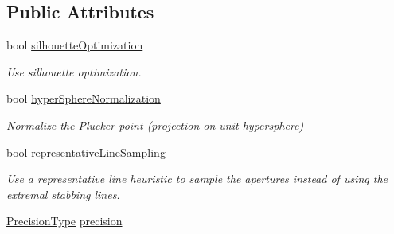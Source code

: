 \subsection*{Public Attributes}
\begin{DoxyCompactItemize}
\item 
\mbox{\label{structvisilib_1_1_visibility_exact_query_configuration_a9c7e192417bf965199370bc13fe4d572}} 
bool \mbox{\hyperlink{structvisilib_1_1_visibility_exact_query_configuration_a9c7e192417bf965199370bc13fe4d572}{silhouette\+Optimization}}
\begin{DoxyCompactList}\small\item\em Use silhouette optimization. \end{DoxyCompactList}\item 
\mbox{\label{structvisilib_1_1_visibility_exact_query_configuration_ae3f308c718e6e7051c9d8a1d08065def}} 
bool \mbox{\hyperlink{structvisilib_1_1_visibility_exact_query_configuration_ae3f308c718e6e7051c9d8a1d08065def}{hyper\+Sphere\+Normalization}}
\begin{DoxyCompactList}\small\item\em Normalize the Plucker point (projection on unit hypersphere) \end{DoxyCompactList}\item 
\mbox{\label{structvisilib_1_1_visibility_exact_query_configuration_adadc6d7391bfcfdd0b8f20efe79c81cf}} 
bool \mbox{\hyperlink{structvisilib_1_1_visibility_exact_query_configuration_adadc6d7391bfcfdd0b8f20efe79c81cf}{representative\+Line\+Sampling}}
\begin{DoxyCompactList}\small\item\em Use a representative line heuristic to sample the apertures instead of using the extremal stabbing lines. \end{DoxyCompactList}\item 
\mbox{\label{structvisilib_1_1_visibility_exact_query_configuration_a85a72847cd60b3d5d41d0a893e439a71}} 
\mbox{\hyperlink{structvisilib_1_1_visibility_exact_query_configuration_a1cd44b0dffc3d51eb0bd5af35eeb9a8b}{Precision\+Type}} \mbox{\hyperlink{structvisilib_1_1_visibility_exact_query_configuration_a85a72847cd60b3d5d41d0a893e439a71}{precision}}

\end{DoxyCompactItemize}

